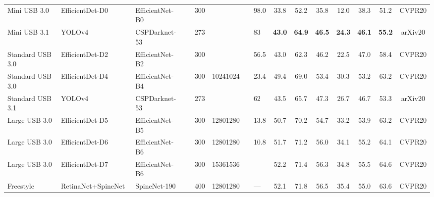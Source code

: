 \documentclass[10pt,twocolumn,letterpaper]{article}
\newcommand{\TB}{\textbf}
\begin{document}
\begin{table*}[t]
\begin{center}
{\begin{tabular}{lllcclclccccccc}
	Mini USB 3.0     & EfficientDet-D0~\cite{EfficientDet_CVPR2020}            & EfficientNet-B0      &     &   300   & \;\:512\;\:512   &         & 98.0         &   33.8    &   52.2    &   35.8    &   12.0    &   38.3    &   51.2    &  CVPR20   \\
	Mini USB 3.1     & YOLOv4~\cite{YOLOv4_2020}                               & CSPDarknet-53        &     &   273   & \;\:512\;\:512   &         & 83           & \TB{43.0} & \TB{64.9} & \TB{46.5} & \TB{24.3} & \TB{46.1} & \TB{55.2} &  arXiv20  \\ \midrule
	Standard USB 3.0 & EfficientDet-D2~\cite{EfficientDet_CVPR2020}            & EfficientNet-B2      &     &   300   & \;\:768\;\:768   &         & 56.5         &   43.0    &   62.3    &   46.2    &   22.5    &   47.0    &   58.4    &  CVPR20   \\
	Standard USB 3.0 & EfficientDet-D4~\cite{EfficientDet_CVPR2020}            & EfficientNet-B4      &     &   300   & 10241024         &         & 23.4         &   49.4    &   69.0    &   53.4    &   30.3    &   53.2    &   63.2    &  CVPR20   \\
	Standard USB 3.1 & YOLOv4~\cite{YOLOv4_2020}                               & CSPDarknet-53        &     &   273   & \;\:608\;\:608   &         & 62           &   43.5    &   65.7    &   47.3    &   26.7    &   46.7    &   53.3    &  arXiv20  \\ \midrule
	Large USB 3.0    & EfficientDet-D5~\cite{EfficientDet_CVPR2020}            & EfficientNet-B5      &     &   300   & 12801280         &         & 13.8         &   50.7    &   70.2    &   54.7    &   33.2    &   53.9    &   63.2    &  CVPR20   \\
	Large USB 3.0    & EfficientDet-D6~\cite{EfficientDet_CVPR2020}            & EfficientNet-B6      &     &   300   & 12801280         &         & 10.8         &   51.7    &   71.2    &   56.0    &   34.1    &   55.2    &   64.1    &  CVPR20   \\
	Large USB 3.0    & EfficientDet-D7~\cite{EfficientDet_CVPR2020}            & EfficientNet-B6      &     &   300   & 15361536         &         & \;\:8.2      &   52.2    &   71.4    &   56.3    &   34.8    &   55.5    &   64.6    &  CVPR20   \\ \midrule
	Freestyle        & RetinaNet+SpineNet~\cite{SpineNet_CVPR2020}             & SpineNet-190         &     &   400   & 12801280         &         & ---          &   52.1    &   71.8    &   56.5    &   35.4    &   55.0    &   63.6    &  CVPR20   \\

\end{tabular}}
\end{center}
\end{table*}
\end{document}
